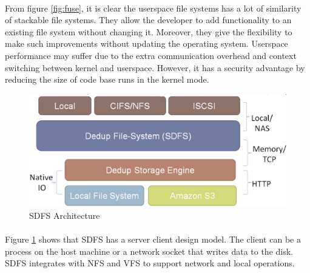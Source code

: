 \paragraph{}
From figure \ref{fig:fuse}, it is clear the userspace file systems has a lot of similarity of stackable file systems. They allow the developer
to add functionality to an existing file system without changing it. Moreover, they give the flexibility to make such improvements without 
updating the operating system. Userspace performance may suffer due to the extra communication overhead and context switching between kernel and userspace.
However, it has a security advantage by reducing the size of code base runs in the kernel mode.

\begin{figure}
\label{fig:sdfsarch}
\begin{center}
\includegraphics[scale=0.30]{sdfs_arch.eps}
\caption{SDFS Architecture\cite{web:opendedup}}
\end{center}
\end{figure}

\paragraph{}
Figure \ref{fig:sdfsarch} shows that SDFS has a server client design model. The client can be a process on the host machine or a network socket that
writes data to the disk. SDFS integrates with NFS and VFS to support network and local operations. 


